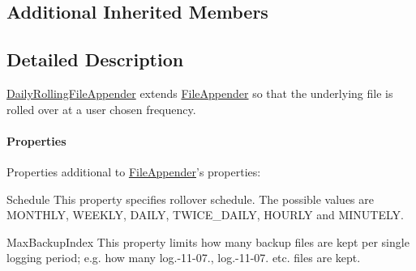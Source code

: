\subsection*{Additional Inherited Members}


\subsection{Detailed Description}
\hyperlink{classlog4cplus_1_1DailyRollingFileAppender}{Daily\-Rolling\-File\-Appender} extends \hyperlink{classlog4cplus_1_1FileAppender}{File\-Appender} so that the underlying file is rolled over at a user chosen frequency.

\paragraph*{Properties}

Properties additional to \hyperlink{classlog4cplus_1_1FileAppender}{File\-Appender}'s properties\-:


\begin{DoxyDescription}
\item[{\ttfamily Schedule} ]This property specifies rollover schedule. The possible values are {\ttfamily M\-O\-N\-T\-H\-L\-Y}, {\ttfamily W\-E\-E\-K\-L\-Y}, {\ttfamily D\-A\-I\-L\-Y}, {\ttfamily T\-W\-I\-C\-E\-\_\-\-D\-A\-I\-L\-Y}, {\ttfamily H\-O\-U\-R\-L\-Y} and {\ttfamily M\-I\-N\-U\-T\-E\-L\-Y}.


\item[{\ttfamily Max\-Backup\-Index} ]This property limits how many backup files are kept per single logging period; e.\-g. how many {\ttfamily log.-\/11-\/07.}, {\ttfamily log.-\/11-\/07.} etc. files are kept.


\end{DoxyDescription}

